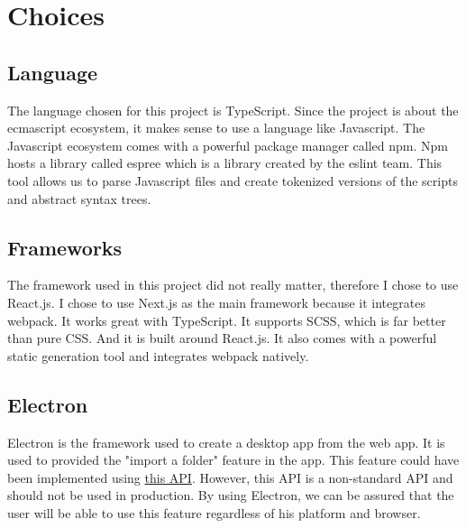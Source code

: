 \section{Choices}

\subsection{Language} 
The language chosen for this project is TypeScript. 
Since the project is about the ecmascript ecosystem, it makes sense to use a language like Javascript. 
The Javascript ecosystem comes with a powerful package manager called npm. 
Npm hosts a library called espree which is a library created by the eslint team. 
This tool allows us to parse Javascript files and create tokenized versions of the scripts and abstract syntax trees.

\subsection{Frameworks}
The framework used in this project did not really matter, 
therefore I chose to use React.js. 
I chose to use Next.js as the main framework because it integrates webpack. 
It works great with TypeScript. 
It supports SCSS, which is far better than pure CSS. And it is built around React.js.
It also comes with a powerful static generation tool and integrates webpack natively.

\subsection{Electron}
Electron is the framework used to create a desktop app from the web app. 
It is used to provided the "import a folder" feature in the app. 
This feature could have been implemented using 
\href{https://developer.mozilla.org/en-US/docs/Web/API/HTMLInputElement/webkitdirectory}{this API}. 
However, this API is a non-standard API and should not be used in production. 
By using Electron, we can be assured that the user will be able to use this feature regardless of his platform and browser.



